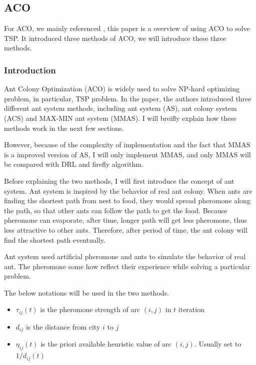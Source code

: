 \documentclass[twocolumn, a4paper]{extarticle}
\begin{document}
\subsection{ACO}

For ACO, we mainly referenced \cite{stutzle1999aco}, this paper is a overview of using ACO to solve TSP. It introduced three methods of ACO, we will introduce these three methods.

\subsubsection{Introduction}
Ant Colony Optimization (ACO) is widely used to solve NP-hard optimizing problem, in particular, TSP problem. In the paper, the authors introduced three different ant system methods, including ant system (AS), ant colony system (ACS) and MAX-MIN ant system (MMAS). I will breifly explain how these methods work in the next few sections.

However, because of the complexity of implementation and the fact that MMAS is a improved version of AS, I will only implement MMAS, and only MMAS will be compared with DRL and firefly algorithm.

Before explaining the two methods, I will first introduce the concept of ant system. Ant system is inspired by the behavior of real ant colony. When ants are finding the shortest path from nest to food, they would spread pheromone along the path, so that other ants can follow the path to get the food. Because pheromone can evaporate, after time, longer path will get less pheromone, thus less attractive to other ants. Therefore, after period of time, the ant colony will find the shortest path eventually. 

Ant system used artificial pheromone and ants to simulate the behavior of real ant. The pheromone some how reflect their experience while solving a particular problem.

The below notations will be used in the two methods.

\begin{itemize}
	\item $\tau_{ij}(t)$ is the pheromone strength of arc $(i, j)$ in $t$ iteration
	\item $d_{ij}$ is the distance from city $i$ to $j$
	\item $\eta_{ij}(t)$ is the priori available heuristic value of arc $(i, j)$. Usually set to $1/d_{ij}(t)$
\end{itemize}
\end{document}
